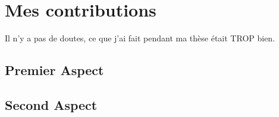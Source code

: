 

\section*{Mes contributions} %
\label{sec:contributions_fr}


Il n'y a pas de doutes, ce que j'ai fait pendant ma thèse était TROP bien.

\subsection*{Premier Aspect} %
\label{sub:premier_aspect_fr}

\lipsum[9-11]


\subsection*{Second Aspect} %
\label{sub:second_aspect_fr}

\lipsum[12-15]


